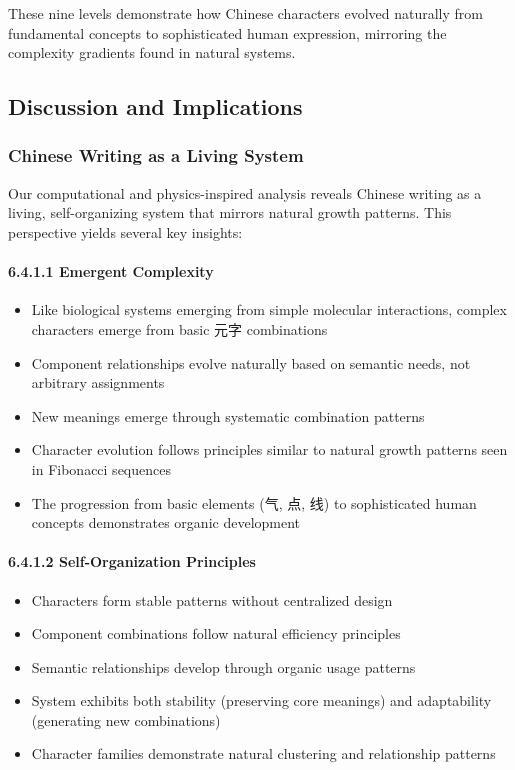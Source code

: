 \documentclass[11pt,letterpaper]{article}
\begin{document}
These nine levels demonstrate how Chinese characters evolved naturally
from fundamental concepts to sophisticated human expression, mirroring
the complexity gradients found in natural systems.

\subsection{Discussion and
Implications}\label{discussion-and-implications}

\subsubsection{Chinese Writing as a Living System}\label{chinese-writing-as-a-living-system}

Our computational and physics-inspired analysis reveals Chinese writing
as a living, self-organizing system that mirrors natural growth
patterns. This perspective yields several key insights:

\paragraph{6.4.1.1 Emergent Complexity}\label{emergent-complexity}

\begin{itemize}
\tightlist
\item
  Like biological systems emerging from simple molecular interactions,
  complex characters emerge from basic 元字 combinations
\item
  Component relationships evolve naturally based on semantic needs, not
  arbitrary assignments
\item
  New meanings emerge through systematic combination patterns
\item
  Character evolution follows principles similar to natural growth
  patterns seen in Fibonacci sequences
\item
  The progression from basic elements (气, 点, 线) to sophisticated
  human concepts demonstrates organic development
\end{itemize}

\paragraph{6.4.1.2 Self-Organization
Principles}\label{self-organization-principles}

\begin{itemize}
\tightlist
\item
  Characters form stable patterns without centralized design
\item
  Component combinations follow natural efficiency principles
\item
  Semantic relationships develop through organic usage patterns
\item
  System exhibits both stability (preserving core meanings) and
  adaptability (generating new combinations)
\item
  Character families demonstrate natural clustering and relationship
  patterns
\end{itemize}
\end{document}
